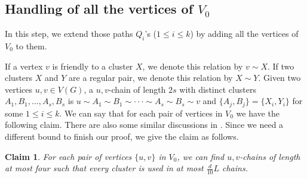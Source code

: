 \documentclass[11pt]{article}
\newtheorem{claim}[lemma]{Claim}
\begin{document}
\subsection{Handling of all the vertices of $V_0$}
In this step, we extend those paths $Q_i$'s ($1\leq i\leq k$) by adding all the vertices of $V_0$ to them.

If a vertex $v$ is friendly to a cluster $X$, we denote this relation by $v\sim X$. If two clusters $X$ and $Y$ are a regular pair, we denote this relation by $X\sim Y$. Given two vertices $u,v\in V(G)$, a $u,v$-chain of length $2s$ with distinct clusters $A_1,B_1,...,A_s,B_s$ is $u\sim A_1\sim B_1\sim \cdot \cdot \cdot \sim A_s\sim B_s\sim v$ and $\{A_j,B_j\}=\{X_i,Y_i\}$ for some $1\leq i\leq k$. We can say that for each pair of vertices in $V_0$ we have the following claim. There are also some similar discussions in \cite{chen}. Since we need a different bound to finish our proof, we give the claim as follows.

\begin{claim}
For each pair of vertices $\{u,v\}$ in $V_0$, we can find $u,v$-chains of length at most four such that every cluster is used in at most $\frac{d}{10}L$ chains.
\end{claim}
\end{document}
